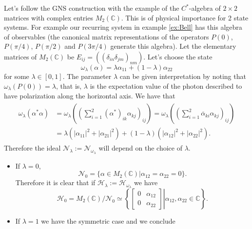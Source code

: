 \begin{example}\label{example:M2}
Let's follow the GNS construction with the example of the $C^*$-algebra of $2\times 2$ matrices with complex entries $M_2(\mathbb{C})$. This is of physical importance for 2 state systems. For example our recurring system in example \ref{ex:Bell} has this algebra of observables (the canonical matrix representations of the operators $P(0)$, $P(\pi/4)$, $P(\pi/2)$ and $P(3\pi/4)$ generate this algebra). Let the elementary matrices of $M_2(\mathbb{C})$ be $E_{ij} = ((\delta_{in}\delta_{jm})_{nm})$. Let's choose the state
\begin{equation}
\omega_\lambda(\alpha) = \lambda \alpha_{11} + (1-\lambda)\alpha_{22}
\end{equation} 
for some $\lambda\in [0,1]$. The parameter $\lambda$ can be given interpretation by noting that $\omega_\lambda(P(0))=\lambda$, that is, $\lambda$ is the expectation value of the photon described to have polarization along the horizontal axis. We have that
\begin{align}
\begin{split}
\omega_\lambda (\alpha^*\alpha) & = \omega_\lambda\left(\left(\sum_{i=1}^2 (\alpha^*)_{ik}\alpha_{kj}\right)_{ij}\right) = \omega_\lambda\left(\left(\sum_{i=1}^2 \overline{\alpha}_{ki}\alpha_{kj}\right)_{ij}\right) \\
& = \lambda(|\alpha_{11}|^2+|\alpha_{21}|^2) + (1-\lambda)(|\alpha_{12}|^2+|\alpha_{22}|^2).
\end{split}
\end{align}
Therefore the ideal $\mathcal{N}_\lambda := \mathcal{N}_{\omega_\lambda}$ will depend on the choice of $\lambda$.
\begin{itemize}
\item If $\lambda = 0$, 
\begin{equation}
\mathcal{N}_0 = \{\alpha\in M_2(\mathbb{C})|\alpha_{12}=\alpha_{22}=0\}.
\end{equation}
Therefore it is clear that if $\mathcal{H}_\lambda:=\mathcal{H}_{\omega_\lambda}$ we have
\begin{equation}
\mathcal{H}_0=M_2(\mathbb{C})/\mathcal{N}_0\simeq\left\{\left.\begin{bmatrix}
0 & \alpha_{12} \\
0 & \alpha_{22}
\end{bmatrix}\right|\alpha_{12},\alpha_{22}\in\mathbb{C}\right\}.
\end{equation}
\item If $\lambda = 1 $ we have the symmetric case and we conclude

\end{itemize}
\end{example}
